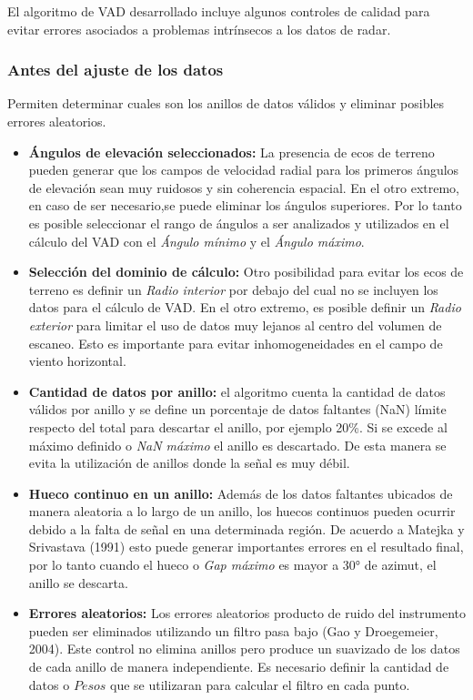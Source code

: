 \documentclass[12pt,spanish,oneside, a4paper]{book}
\providecommand{\tightlist}{%
  \setlength{\itemsep}{0pt}\setlength{\parskip}{0pt}}
\begin{document}
El algoritmo de VAD desarrollado incluye algunos controles de calidad
para evitar errores asociados a problemas intrínsecos a los datos de
radar.

\subsubsection{Antes del ajuste de los
datos}\label{antes-del-ajuste-de-los-datos}

Permiten determinar cuales son los anillos de datos válidos y eliminar
posibles errores aleatorios.

\begin{itemize}
\tightlist
\item
  \textbf{Ángulos de elevación seleccionados:} La presencia de ecos de
  terreno pueden generar que los campos de velocidad radial para los
  primeros ángulos de elevación sean muy ruidosos y sin coherencia
  espacial. En el otro extremo, en caso de ser necesario,se puede
  eliminar los ángulos superiores. Por lo tanto es posible seleccionar
  el rango de ángulos a ser analizados y utilizados en el cálculo del
  VAD con el \emph{Ángulo mínimo} y el \emph{Ángulo máximo}.
\item
  \textbf{Selección del dominio de cálculo:} Otro posibilidad para
  evitar los ecos de terreno es definir un \emph{Radio interior} por
  debajo del cual no se incluyen los datos para el cálculo de VAD. En el
  otro extremo, es posible definir un \emph{Radio exterior} para limitar
  el uso de datos muy lejanos al centro del volumen de escaneo. Esto es
  importante para evitar inhomogeneidades en el campo de viento
  horizontal.
\item
  \textbf{Cantidad de datos por anillo:} el algoritmo cuenta la cantidad
  de datos válidos por anillo y se define un porcentaje de datos
  faltantes (NaN) límite respecto del total para descartar el anillo,
  por ejemplo 20\%. Si se excede al máximo definido o \emph{NaN máximo}
  el anillo es descartado. De esta manera se evita la utilización de
  anillos donde la señal es muy débil.
\item
  \textbf{Hueco continuo en un anillo:} Además de los datos faltantes
  ubicados de manera aleatoria a lo largo de un anillo, los huecos
  continuos pueden ocurrir debido a la falta de señal en una determinada
  región. De acuerdo a Matejka y Srivastava (1991) esto puede generar
  importantes errores en el resultado final, por lo tanto cuando el
  hueco o \emph{Gap máximo} es mayor a 30° de azimut, el anillo se
  descarta.
\item
  \textbf{Errores aleatorios:} Los errores aleatorios producto de ruido
  del instrumento pueden ser eliminados utilizando un filtro pasa bajo
  (Gao y Droegemeier, 2004). Este control no elimina anillos pero
  produce un suavizado de los datos de cada anillo de manera
  independiente. Es necesario definir la cantidad de datos o \(Pesos\)
  que se utilizaran para calcular el filtro en cada punto.
\end{itemize}
\end{document}

